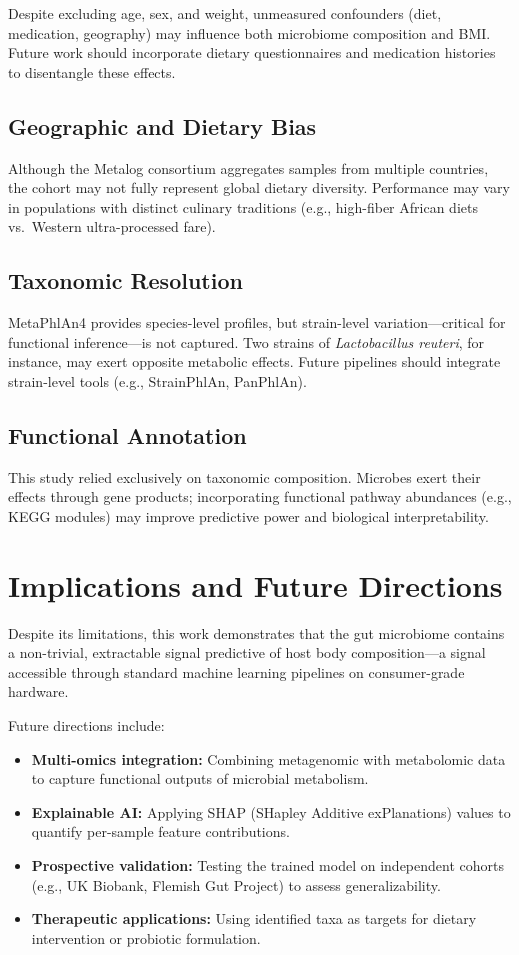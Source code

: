 Despite excluding age, sex, and weight, unmeasured confounders (diet, medication, geography) may influence both microbiome composition and BMI. Future work should incorporate dietary questionnaires and medication histories to disentangle these effects.

\subsection{Geographic and Dietary Bias}

Although the Metalog consortium aggregates samples from multiple countries, the cohort may not fully represent global dietary diversity. Performance may vary in populations with distinct culinary traditions (e.g., high-fiber African diets vs.\ Western ultra-processed fare).

\subsection{Taxonomic Resolution}

MetaPhlAn4 provides species-level profiles, but strain-level variation---critical for functional inference---is not captured. Two strains of \emph{Lactobacillus reuteri}, for instance, may exert opposite metabolic effects. Future pipelines should integrate strain-level tools (e.g., StrainPhlAn, PanPhlAn).

\subsection{Functional Annotation}

This study relied exclusively on taxonomic composition. Microbes exert their effects through gene products; incorporating functional pathway abundances (e.g., KEGG modules) may improve predictive power and biological interpretability.

\section{Implications and Future Directions}

Despite its limitations, this work demonstrates that the gut microbiome contains a non-trivial, extractable signal predictive of host body composition---a signal accessible through standard machine learning pipelines on consumer-grade hardware.

Future directions include:

\begin{itemize}
    \item \textbf{Multi-omics integration:} Combining metagenomic with metabolomic data to capture functional outputs of microbial metabolism.
    \item \textbf{Explainable AI:} Applying SHAP (SHapley Additive exPlanations) values to quantify per-sample feature contributions.
    \item \textbf{Prospective validation:} Testing the trained model on independent cohorts (e.g., UK Biobank, Flemish Gut Project) to assess generalizability.
    \item \textbf{Therapeutic applications:} Using identified taxa as targets for dietary intervention or probiotic formulation.
\end{itemize}
